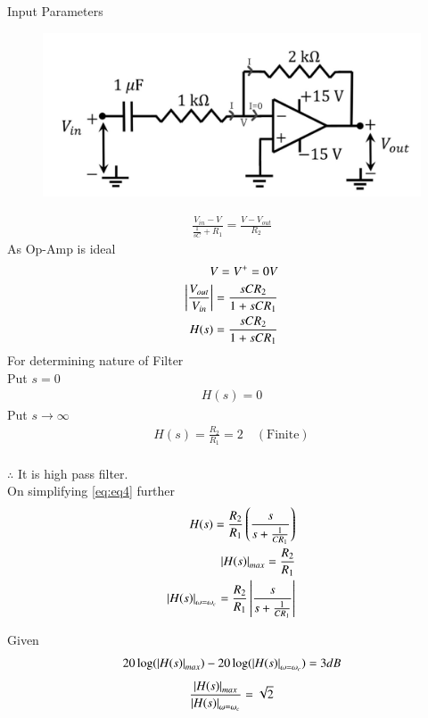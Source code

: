 \documentclass[journal,12pt,twocolumn]{IEEEtran}
\theoremstyle{remark}
\begin{document}
\begin{table}[ht]
  \centering
  
  \caption{Input Parameters}
  \label{tab:tab1}
\end{table}
\begin{figure}[H]
  \centering
  \includegraphics[width=0.7\columnwidth]{figs/afig.jpeg}
  \label{fig:fig1}
\end{figure}
\begin{align}
\frac{V_{in}-V}{\frac{1}{sC}+R_1}=\frac{V-V_{out}}{R_2}
\end{align}
As Op-Amp is ideal
\begin{align}
V=V^+=0V\\
\left\vert\frac{V_{out}}{V_{in}}\right\vert=\frac{sCR_2}{1+sCR_1}\\
H(s)=\frac{sCR_2}{1+sCR_1}
\label{eq:eq4}
\end{align}
For determining nature of Filter\\
Put $s=0$
\begin{align}
H(s)=0
\end{align}
Put $s\rightarrow \infty$
\begin{align}
H(s)=\frac{R_2}{R_1}=2\quad (\text{Finite})
\end{align}\\
$\therefore$ It is high pass filter.\\

On simplifying \eqref{eq:eq4} further
\begin{align}
H(s)=\frac{R_2}{R_1}\left(\frac{s}{s+\frac{1}{CR_1}}\right)\\
\left\vert H(s)\right\vert_{max}=\frac{R_2}{R_1} \label{eq:eq8}\\
\left\vert H(s)\right\vert_{\omega=\omega_c}=\frac{R_2}{R_1}\left\vert\frac{s}{s+\frac{1}{CR_1}}\right\vert
\label{eq:eq9}
\end{align}

Given 
\begin{align}
20\log(\left\vert H(s)\right\vert_{max})-20\log(\left\vert H(s)\right\vert_{\omega=\omega_c})=3 dB
\end{align}
\begin{align}
\frac{\left\vert H(s)\right\vert_{max}}{\left\vert H(s)\right\vert_{\omega=\omega_c}}=\sqrt 2
\end{align}
 
\end{document}
